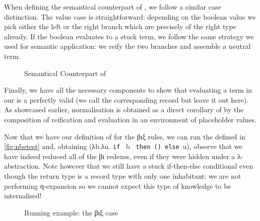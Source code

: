 When defining the semantical counterpart of , we follow a similar
case distinction.
%
The value case is straightforward: depending on the boolean value we
pick either the left or the right branch which are precisely of the right
type already.
%
If the boolean evaluates to a stuck term, we follow the same strategy we
used for semantic application: we reify the two branches and assemble a
neutral term.

\begin{figure}[h]
\caption{Semantical Counterpart of }
\end{figure}

Finally, we have all the necessary components to show that evaluating
a term in our  is a perfectly valid  (we call
the corresponding  record  but leave it out here).
%
As showcased earlier, normalisation is obtained as a direct corollary of
 by the composition of reification and evaluation in an environment
of placeholder values.


Now that we have our definition of  for the βιξ rules, we
can run the  defined in \cref{fig:nbetest} and, obtaining
(λb.λu. \texttt{if~} b \texttt{~then~()~else~}u),
observe that
we have indeed reduced all of the βι redexes, even if they were
hidden under a λ-abstraction. Note however that we still have a stuck
if-then-else conditional even though the return type is a record type
with only one inhabitant: we are not performing η-expansion so we cannot
expect this type of knowledge to be internalised!

\begin{figure}[h]
\caption{Running example: the βιξ case}\label{fig:betaiotaxitest}
\end{figure}

